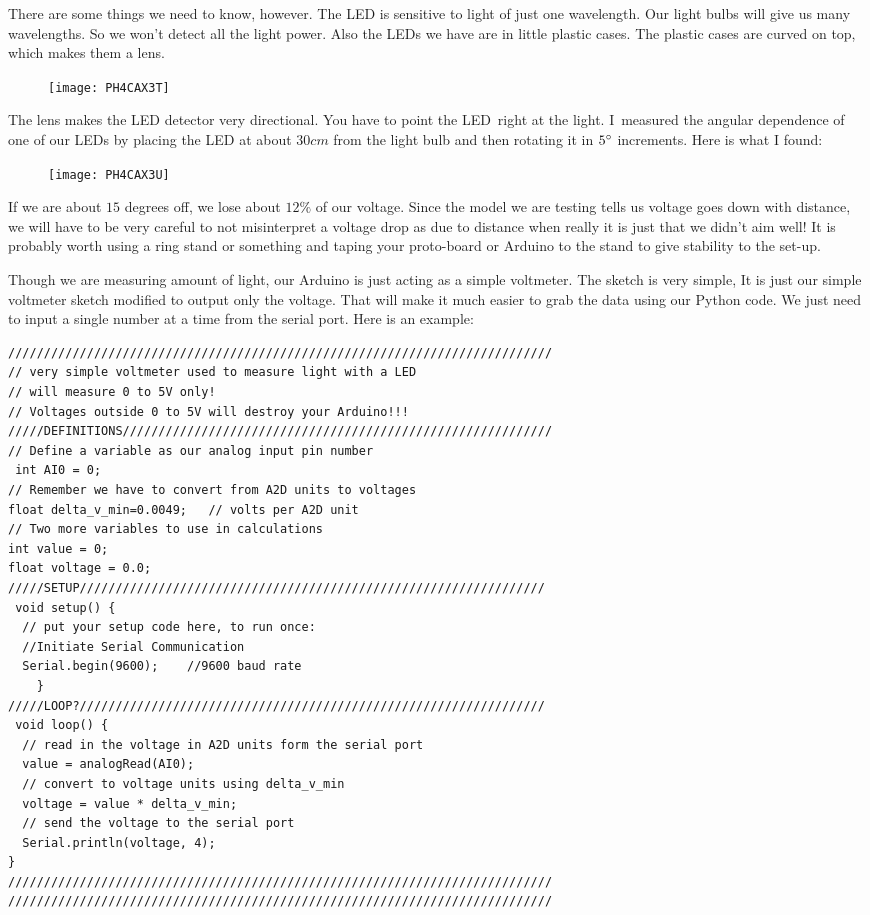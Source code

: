 There are some things we need to know, however. The LED is sensitive to
light of just one wavelength. Our light bulbs will give us many wavelengths.
So we won't detect all the light power. Also the LEDs we have are in little
plastic cases. The plastic cases are curved on top, which makes them a lens. 
\begin{figure}[h!]
\texttt{[image: PH4CAX3T]}
\end{figure}The lens makes the LED detector
very directional. You have to point the LED\ right at the light. I\ measured
the angular dependence of one of our LEDs by placing the LED at about $30%
\unit{cm}$ from the light bulb and then rotating it in $5\unit{%
{{}^\circ}%
}$ increments. Here is what I found: \begin{figure}[h!]
\texttt{[image: PH4CAX3U]}
\end{figure}If we are about $15$ degrees off,
we lose about $12\%$ of our voltage. Since the model we are testing tells us
voltage goes down with distance, we will have to be very careful to not
misinterpret a voltage drop as due to distance when really it is just that
we didn't aim well! It is probably worth using a ring stand or something and
taping your proto-board or Arduino to the stand to give stability to the
set-up.

Though we are measuring amount of light, our Arduino is just acting as a
simple voltmeter. The sketch is very simple, It is just our simple voltmeter
sketch modified to output only the voltage. That will make it much easier to
grab the data using our Python code. We just need to input a single number
at a time from the serial port. Here is an example:
\begin{verbatim}
////////////////////////////////////////////////////////////////////////////
// very simple voltmeter used to measure light with a LED
// will measure 0 to 5V only!
// Voltages outside 0 to 5V will destroy your Arduino!!!
/////DEFINITIONS////////////////////////////////////////////////////////////
// Define a variable as our analog input pin number
 int AI0 = 0;
// Remember we have to convert from A2D units to voltages
float delta_v_min=0.0049;   // volts per A2D unit
// Two more variables to use in calculations
int value = 0;
float voltage = 0.0;
/////SETUP/////////////////////////////////////////////////////////////////
 void setup() {
  // put your setup code here, to run once:
  //Initiate Serial Communication
  Serial.begin(9600);    //9600 baud rate
    }
/////LOOP?/////////////////////////////////////////////////////////////////
 void loop() {
  // read in the voltage in A2D units form the serial port
  value = analogRead(AI0); 
  // convert to voltage units using delta_v_min
  voltage = value * delta_v_min;
  // send the voltage to the serial port 
  Serial.println(voltage, 4);  
}
////////////////////////////////////////////////////////////////////////////
////////////////////////////////////////////////////////////////////////////
\end{verbatim}

